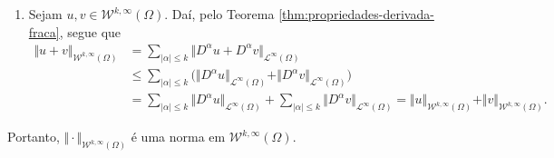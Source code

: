 \documentclass[a4paper, 11pt]{book}
\theoremstyle{definition}
\newcommand{\cL}{\mathcal{L}}
\newcommand{\cW}{\mathcal{W}}
\begin{document}
\begin{prf}
\begin{enumerate}[leftmargin=*]
        \item Sejam $u, v \in \cW^{k,\infty}(\Omega)$. Daí, pelo Teorema \ref{thm:propriedades-derivada-fraca}, segue que
        \[
            \begin{aligned}
                \Vert u + v \Vert_{\cW^{k,\infty}(\Omega)} &= \sum_{|\alpha| \leqslant k} \Vert D^\alpha u + D^\alpha v \Vert_{\cL^\infty(\Omega)}\\ &\leqslant \sum_{|\alpha| \leqslant k} \Big( \Vert D^\alpha u \Vert_{\cL^\infty(\Omega)} + \Vert D^\alpha v \Vert_{\cL^\infty(\Omega)} \Big)\\
                &= \sum_{|\alpha| \leqslant k} \Vert D^\alpha u \Vert_{\cL^\infty(\Omega)} + \sum_{|\alpha| \leqslant k}\Vert D^\alpha v \Vert_{\cL^\infty(\Omega)} = \Vert u \Vert_{\cW^{k,\infty}(\Omega)} + \Vert v \Vert_{\cW^{k,\infty}(\Omega)}.
            \end{aligned}
        \]
    \end{enumerate}
    Portanto, $\Vert \cdot \Vert_{\cW^{k,\infty}(\Omega)}$ é uma norma em $\cW^{k,\infty}(\Omega)$.

\end{prf}
\end{document}
